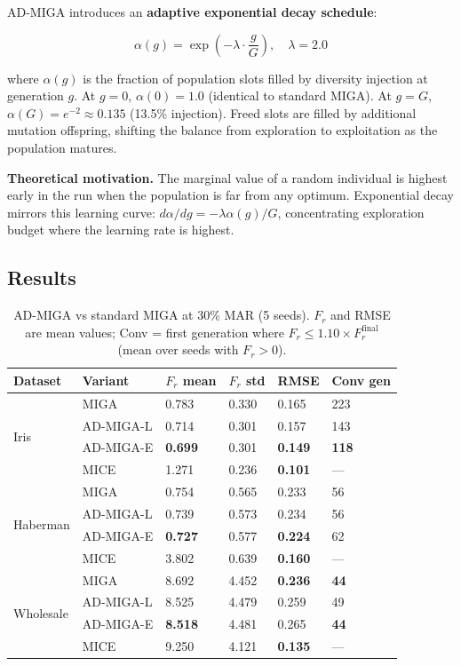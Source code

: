 AD-MIGA introduces an \textbf{adaptive exponential decay schedule}:

\begin{equation}
    \alpha(g) = \exp\!\left(-\lambda \cdot \frac{g}{G}\right), \quad \lambda = 2.0
    \label{eq:ad_decay_full}
\end{equation}

where $\alpha(g)$ is the fraction of population slots filled by diversity injection at generation $g$. At $g=0$, $\alpha(0) = 1.0$ (identical to standard MIGA). At $g=G$, $\alpha(G) = e^{-2} \approx 0.135$ (13.5\% injection). Freed slots are filled by additional mutation offspring, shifting the balance from exploration to exploitation as the population matures.

\textbf{Theoretical motivation.} The marginal value of a random individual is highest early in the run when the population is far from any optimum. Exponential decay mirrors this learning curve: $d\alpha/dg = -\lambda \alpha(g)/G$, concentrating exploration budget where the learning rate is highest.

\subsection{Results}
\label{sec:ad_miga_results}

\begin{table}[h]
\caption{AD-MIGA vs standard MIGA at 30\% MAR (5 seeds). $F_r$ and RMSE are mean values; Conv = first generation where $F_r \leq 1.10 \times F_r^{\text{final}}$ (mean over seeds with $F_r > 0$).}
\label{tab:ad_miga_full}
\centering
\begin{tabular}{llllll}
\toprule
\textbf{Dataset} & \textbf{Variant} & \textbf{$F_r$ mean} & \textbf{$F_r$ std} & \textbf{RMSE} & \textbf{Conv gen} \\
\midrule
\multirow{4}{*}{Iris}
 & MIGA        & 0.783 & 0.330 & 0.165 & 223 \\
 & AD-MIGA-L   & 0.714 & 0.301 & 0.157 & 143 \\
 & AD-MIGA-E   & \textbf{0.699} & 0.301 & \textbf{0.149} & \textbf{118} \\
 & MICE        & 1.271 & 0.236 & \textbf{0.101} & --- \\
\midrule
\multirow{4}{*}{Haberman}
 & MIGA        & 0.754 & 0.565 & 0.233 & 56 \\
 & AD-MIGA-L   & 0.739 & 0.573 & 0.234 & 56 \\
 & AD-MIGA-E   & \textbf{0.727} & 0.577 & \textbf{0.224} & 62 \\
 & MICE        & 3.802 & 0.639 & \textbf{0.160} & --- \\
\midrule
\multirow{4}{*}{Wholesale}
 & MIGA        & 8.692 & 4.452 & \textbf{0.236} & \textbf{44} \\
 & AD-MIGA-L   & 8.525 & 4.479 & 0.259 & 49 \\
 & AD-MIGA-E   & \textbf{8.518} & 4.481 & 0.265 & \textbf{44} \\
 & MICE        & 9.250 & 4.121 & \textbf{0.135} & --- \\
\bottomrule
\end{tabular}
\end{table}

